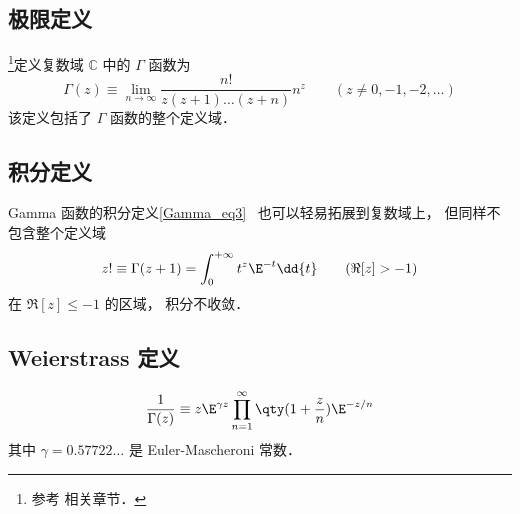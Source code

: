 
\subsection{极限定义}
\footnote{参考 \cite{Arfken} 相关章节．}定义复数域 $\mathbb C$ 中的 $\Gamma$ 函数为
\begin{equation}
\Gamma(z) \equiv \lim_{n\to\infty} \frac{n!}{z(z+1)\dots(z+n)}n^z \qquad (z \ne 0, -1, -2,\dots)
\end{equation}
该定义包括了 $\Gamma$ 函数的整个定义域．

\subsection{积分定义}
Gamma 函数的积分定义\autoref{Gamma_eq3}~ 也可以轻易拓展到复数域上， 但同样不包含整个定义域
\begin{equation}
z! \equiv \Gamma (z + 1) = \int_0^{+\infty} t^z \E^{-t} \dd{t} \qquad (\Re[z] > -1)
\end{equation}
在 $\Re[z] \leqslant -1$ 的区域， 积分不收敛．

\subsection{Weierstrass 定义}
\begin{equation}
\frac{1}{\Gamma(z)} \equiv z \E^{\gamma z} \prod_{n=1}^\infty \qty(1 + \frac{z}{n}) \E^{-z/n}
\end{equation}
其中 $\gamma = 0.57722\dots$ 是 Euler-Mascheroni 常数．
